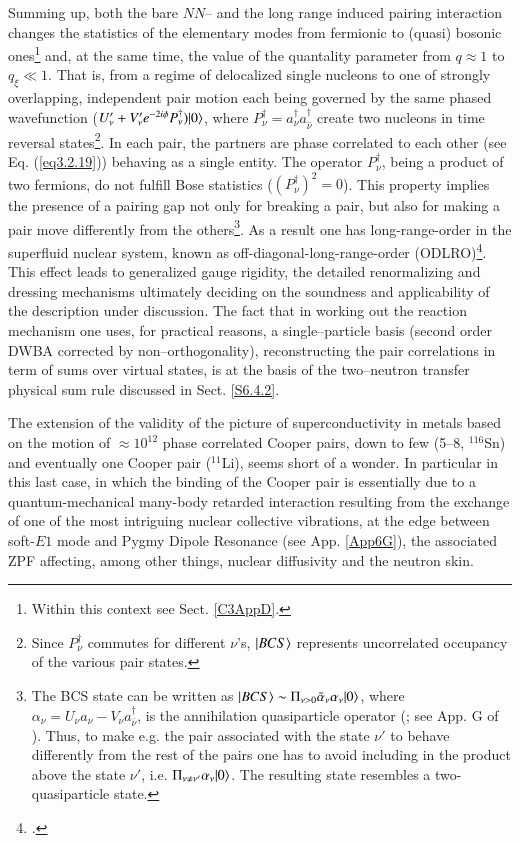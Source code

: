 \begin{subappendices}
Summing up, both the bare $NN$-- and the long range induced pairing interaction changes the statistics of the elementary modes from fermionic to (quasi) bosonic ones\footnote{Within this context see Sect. \ref{C3AppD}.} and, at the same time, the value of the quantality parameter from $q\approx1$ to $q_\xi\ll 1$. That is,   from a regime of delocalized single nucleons to one of strongly overlapping, independent pair motion each being governed by the same phased wavefunction ($U'_{\nu}+V'_{\nu}e^{-2i\phi}P^\dagger_\nu)|{0} \rangle$, where $P^\dagger_\nu=a^\dagger_\nu a^\dagger_{\hat\nu}$ create two nucleons in time reversal states\footnote{Since $P^\dagger_\nu$ commutes for different $\nu$'s, $|{BCS} \rangle$ represents uncorrelated occupancy of the various pair states.}. In each pair, the partners are phase correlated to each other (see Eq. (\ref{eq3.2.19})) behaving as a single entity. The operator $P^\dagger_\nu$, being a product of two fermions, do not fulfill Bose statistics ($(P^\dagger_\nu)^2=0$). This property implies the presence of a pairing gap not only for breaking a pair, but also for making a pair move differently from the others\footnote{The BCS state can be written as $|{BCS} \rangle\sim\Pi_{\nu>0} \bar\alpha_\nu\alpha_\nu|{0} \rangle$, where $\alpha_\nu=U_\nu a_\nu-V_\nu a^\dagger_{\bar{\nu}}$, is the annihilation quasiparticle operator (\cite{Bogoljubov:58,Valatin:58}; see App. G of \cite{Brink:05}). Thus, to make e.g. the pair associated with the state $\nu'$ to behave differently from the rest of the pairs one has to avoid including in the product above the state $\nu'$, i.e. $\Pi_{\nu\neq\nu'} \alpha_\nu|{0} \rangle$. The resulting state resembles a two-quasiparticle state.}. As a result one has long-range-order in the superfluid nuclear system, known as off-diagonal-long-range-order (ODLRO)\footnote{\cite{Yang:62}.}.  This effect leads  to  generalized gauge rigidity, the detailed renormalizing and dressing mechanisms ultimately deciding on the soundness and applicability of the description under discussion. The fact that in working out the reaction mechanism one uses, for practical reasons, a single--particle basis (second order DWBA corrected by non--orthogonality), reconstructing the pair correlations in term of sums over virtual states, is at the basis of the two--neutron transfer physical sum rule discussed in Sect. \ref{S6.4.2}.
 
 The extension of the validity of the picture of superconductivity in metals based on the motion of $\approx10^{12}$ phase correlated Cooper pairs, down to few (5--8, $^{116}$Sn) and eventually  one Cooper pair ($^{11}$Li), seems short of a wonder. In particular in this last case, in which the binding of the Cooper pair is essentially due to a  quantum-mechanical many-body retarded interaction resulting from the exchange of one of the most intriguing nuclear collective vibrations, at the edge between soft-$E1$ mode and Pygmy Dipole Resonance (see App. \ref{App6G}), the associated ZPF affecting, among other things, nuclear diffusivity and the neutron skin.
 

\end{subappendices}
